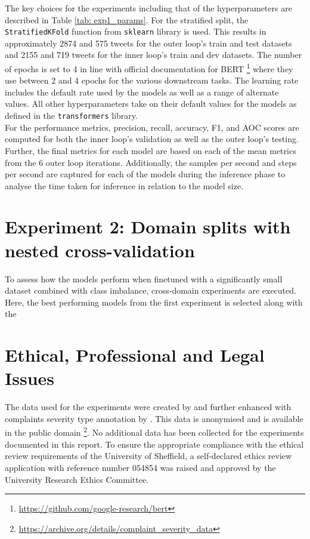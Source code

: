 The key choices for the experiments including that of the hyperparameters are described in Table \ref{tab: exp1_params}. For the stratified split, the \texttt{StratifiedKFold} function from \texttt{sklearn} library is used. This results in approximately 2874 and 575 tweets for the outer loop's train and test datasets and 2155 and 719 tweets for the inner loop's train and dev datasets. The number of epochs is set to 4 in line with official documentation for BERT \footnote{\url{https://github.com/google-research/bert}} where they use between 2 and 4 epochs for the various downstream tasks. The learning rate includes the default rate used by the models as well as a range of alternate values. All other hyperparameters take on their default values for the models as defined in the \texttt{transformers} library.\\

For the performance metrics, precision, recall, accuracy, F1, and AOC scores are computed for both the inner loop's validation as well as the outer loop's testing. Further, the final metrics for each model are based on each of the mean metrics from the 6 outer loop iterations. Additionally, the samples per second and steps per second are captured for each of the models during the inference phase to analyse the time taken for inference in relation to the model size.

\section{Experiment 2: Domain splits with nested cross-validation}
To assess how the models perform when finetuned with a significantly small dataset combined with class imbalance, cross-domain experiments are executed. Here, the best performing models from the first experiment is selected along with the 

\section{Ethical, Professional and Legal Issues}
The data used for the experiments were created by \cite{preotiuc-pietro_automatically_2019} and further enhanced with complaints severity type annotation by \cite{jinModelingSeverityComplaints2021}. This data is anonymised and is available in the public domain \footnote{\url{ https://archive.org/details/complaint_severity_data}}. No additional data has been collected for the experiments documented in this report. To ensure the appropriate compliance with the ethical review requirements of the University of Sheffield, a self-declared ethics review application with reference number 054854 was raised and approved by the University Research Ethics Committee. 
